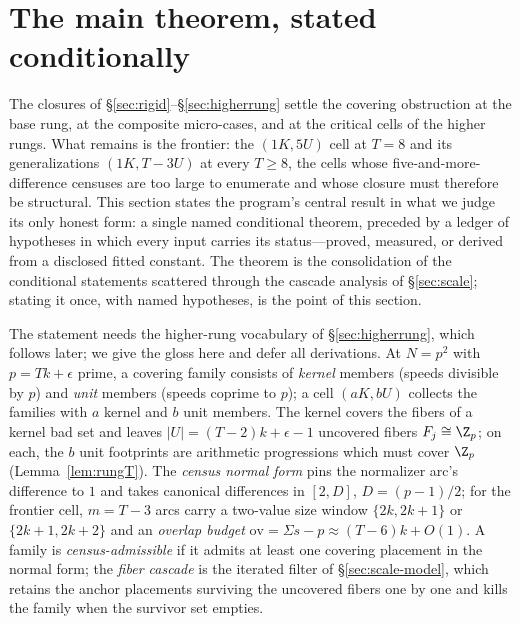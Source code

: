 
\section{The main theorem, stated conditionally}\label{sec:SC}

The closures of \S\ref{sec:rigid}--\S\ref{sec:higherrung} settle the
covering obstruction at the base rung, at the composite micro-cases, and
at the critical cells of the higher rungs. What remains is the frontier:
the $(1K,5U)$ cell at $T=8$ and its generalizations $(1K,T{-}3U)$ at
every $T\ge 8$, the cells whose five-and-more-difference censuses are too
large to enumerate and whose closure must therefore be structural. This
section states the program's central result in what we judge its only
honest form: a single named conditional theorem, preceded by a ledger of
hypotheses in which every input carries its status---proved, measured,
or derived from a disclosed fitted constant. The theorem is the
consolidation of the conditional statements scattered through the
cascade analysis of \S\ref{sec:scale}; stating it once, with named
hypotheses, is the point of this section.

The statement needs the higher-rung vocabulary of
\S\ref{sec:higherrung}, which follows later; we give the gloss here and
defer all derivations. At $N=p^2$ with $p=Tk+\epsilon$ prime, a covering
family consists of \emph{kernel} members (speeds divisible by $p$) and
\emph{unit} members (speeds coprime to $p$); a cell $(aK,bU)$ collects
the families with $a$ kernel and $b$ unit members. The kernel covers the
fibers of a kernel bad set and leaves $|U|=(T-2)k+\epsilon-1$ uncovered
fibers $F_j\cong\Z_p$; on each, the $b$ unit footprints are arithmetic
progressions which must cover $\Z_p$ (Lemma~\ref{lem:rungT}). The
\emph{census normal form} pins the normalizer arc's difference to $1$
and takes canonical differences in $[2,D]$, $D=(p-1)/2$; for the
frontier cell, $m=T-3$ arcs carry a two-value size window
$\{2k,2k+1\}$ or $\{2k+1,2k+2\}$ and an \emph{overlap budget}
$\mathrm{ov}=\Sigma s-p\approx(T-6)k+O(1)$. A family is
\emph{census-admissible} if it admits at least one covering placement in
the normal form; the \emph{fiber cascade} is the iterated filter of
\S\ref{sec:scale-model}, which retains the anchor placements surviving
the uncovered fibers one by one and kills the family when the survivor
set empties.

